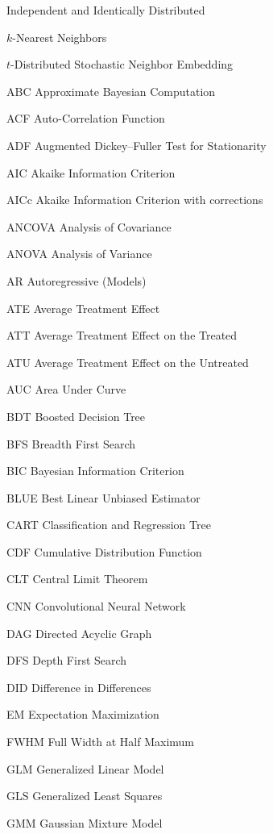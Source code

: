 \begin{symbollist}
  \item[\iid] Independent and Identically Distributed
  \item[\kNN] $k$-Nearest Neighbors
  \item[\tSNE] $t$-Distributed Stochastic Neighbor Embedding
  \item[ABC] Approximate Bayesian Computation
  \item[ACF] Auto-Correlation Function
  \item[ADF] Augmented Dickey--Fuller Test for Stationarity
  \item[AIC] Akaike Information Criterion
  \item[AICc] Akaike Information Criterion with corrections
  \item[ANCOVA] Analysis of Covariance
  \item[ANOVA] Analysis of Variance
  \item[AR] Autoregressive (Models)
  \item[ATE] Average Treatment Effect
  \item[ATT] Average Treatment Effect on the Treated
  \item[ATU] Average Treatment Effect on the Untreated
  \item[AUC] Area Under Curve
  \item[BDT] Boosted Decision Tree
  \item[BFS] Breadth First Search
  \item[BIC] Bayesian Information Criterion
  \item[BLUE] Best Linear Unbiased Estimator
  \item[CART] Classification and Regression Tree
  \item[CDF] Cumulative Distribution Function
  \item[CLT] Central Limit Theorem
  \item[CNN] Convolutional Neural Network
  \item[DAG] Directed Acyclic Graph
  \item[DFS] Depth First Search
  \item[DID] Difference in Differences
  \item[EM] Expectation Maximization
  \item[FWHM] Full Width at Half Maximum
  \item[GLM] Generalized Linear Model
  \item[GLS] Generalized Least Squares
  \item[GMM] Gaussian Mixture Model

\end{symbollist}
